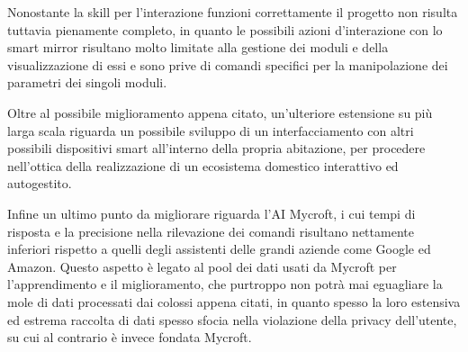\documentclass[12pt,a4paper]{article}
\begin{document}
Nonostante la skill per l'interazione funzioni correttamente il progetto non risulta tuttavia pienamente
completo, in quanto le possibili azioni d'interazione con lo smart mirror risultano molto limitate
alla gestione dei moduli e della visualizzazione di essi e sono prive di comandi specifici per la
manipolazione dei parametri dei singoli moduli.

Oltre al possibile miglioramento appena citato, un'ulteriore estensione su pi\`u larga scala riguarda
un possibile sviluppo di un interfacciamento con altri possibili dispositivi smart all'interno
della propria abitazione, per procedere nell'ottica della realizzazione di un ecosistema domestico
interattivo ed autogestito.

Infine un ultimo punto da migliorare riguarda l'AI Mycroft, i cui tempi di risposta e la precisione nella
rilevazione dei comandi risultano nettamente inferiori rispetto a quelli degli assistenti delle grandi aziende
come Google ed Amazon. Questo aspetto \`e legato al pool dei dati usati da Mycroft per l'apprendimento e il 
miglioramento, che purtroppo non potr\`a mai eguagliare la mole di dati processati dai colossi appena
citati, in quanto spesso la loro estensiva ed estrema raccolta di dati spesso sfocia nella violazione della
privacy dell'utente, su cui al contrario \`e invece fondata Mycroft.

\printbibliography
\end{document}
